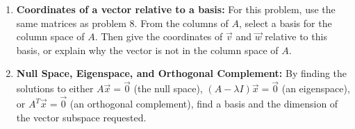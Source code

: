 \begin{enumerate}
\begin{enumerate}
\end{enumerate}


\item  {\bf Coordinates of a vector relative to a basis:} \label{coordinates} For this problem, use the same matrices as problem 8.  From the columns of $A$, select a basis for the column space of $A$. Then give the coordinates of $\vec v$ and $\vec w$ relative to this basis, or explain why the vector is not in the column space of $A$.  
\begin{enumerate}
\end{enumerate}



\item  {\bf Null Space, Eigenspace, and Orthogonal Complement:} \label{nullspace}By finding the solutions to either $A\vec x=\vec 0$ (the null space), $(A-\lambda I)\vec x = \vec 0$ (an eigenspace), or $A^T\vec x = \vec 0$ (an orthogonal complement), find a basis and the dimension of the vector subspace requested.


\end{enumerate}
